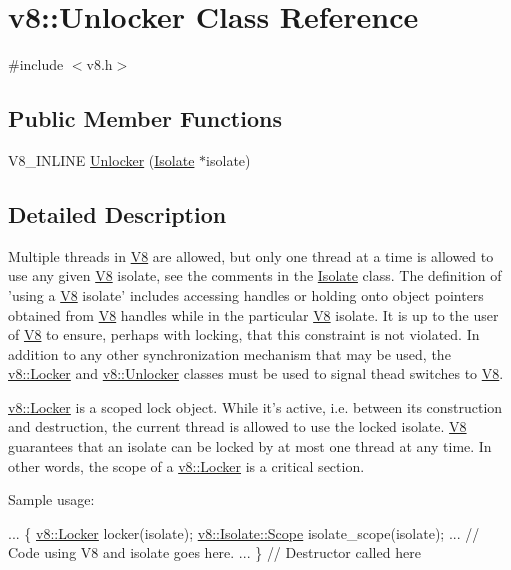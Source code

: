 \hypertarget{classv8_1_1Unlocker}{\section{v8\-:\-:Unlocker Class Reference}
\label{classv8_1_1Unlocker}
}


{\ttfamily \#include $<$v8.\-h$>$}

\subsection*{Public Member Functions}
\begin{DoxyCompactItemize}
\item 
V8\-\_\-\-I\-N\-L\-I\-N\-E \hyperlink{classv8_1_1Unlocker_a2faeb117d7308b65ac85fdad390e4c1f}{Unlocker} (\hyperlink{classv8_1_1Isolate}{Isolate} $\ast$isolate)
\end{DoxyCompactItemize}


\subsection{Detailed Description}
Multiple threads in \hyperlink{classv8_1_1V8}{V8} are allowed, but only one thread at a time is allowed to use any given \hyperlink{classv8_1_1V8}{V8} isolate, see the comments in the \hyperlink{classv8_1_1Isolate}{Isolate} class. The definition of 'using a \hyperlink{classv8_1_1V8}{V8} isolate' includes accessing handles or holding onto object pointers obtained from \hyperlink{classv8_1_1V8}{V8} handles while in the particular \hyperlink{classv8_1_1V8}{V8} isolate. It is up to the user of \hyperlink{classv8_1_1V8}{V8} to ensure, perhaps with locking, that this constraint is not violated. In addition to any other synchronization mechanism that may be used, the \hyperlink{classv8_1_1Locker}{v8\-::\-Locker} and \hyperlink{classv8_1_1Unlocker}{v8\-::\-Unlocker} classes must be used to signal thead switches to \hyperlink{classv8_1_1V8}{V8}.

\hyperlink{classv8_1_1Locker}{v8\-::\-Locker} is a scoped lock object. While it's active, i.\-e. between its construction and destruction, the current thread is allowed to use the locked isolate. \hyperlink{classv8_1_1V8}{V8} guarantees that an isolate can be locked by at most one thread at any time. In other words, the scope of a \hyperlink{classv8_1_1Locker}{v8\-::\-Locker} is a critical section.

Sample usage\-: 
\begin{DoxyCode}
...
\{
  \hyperlink{classv8_1_1Locker}{v8::Locker} locker(isolate);
  \hyperlink{classv8_1_1Isolate_1_1Scope}{v8::Isolate::Scope} isolate\_scope(isolate);
  ...
  \textcolor{comment}{// Code using V8 and isolate goes here.}
  ...
\} \textcolor{comment}{// Destructor called here}
\end{DoxyCode}


